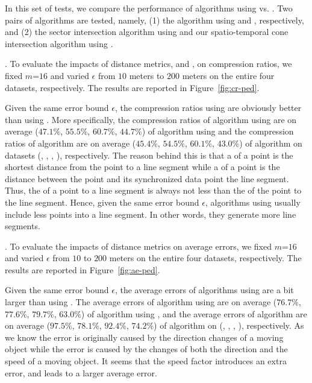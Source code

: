 {In this set of tests, we compare the performance of algorithms using \ped vs. \sed. Two pairs of algorithms are tested, namely, (1) the algorithm \dpa using \ped and \sed, respectively, and (2) the sector intersection  algorithm \cite{Williams:Longest, Sklansky:Cone} using \ped and our spatio-temporal cone intersection algorithm using \sed.

.
To evaluate the impacts of distance metrics, \ie \ped and \sed, on compression ratios, we fixed {$m$=$16$} and varied $\epsilon$ from $10$ meters to $200$ meters on the entire four datasets, respectively.
The results are reported in Figure~\ref{fig:cr-ped}.


Given the same error bound $\epsilon$, the compression ratios using \ped are obviously better
than using \sed.
More specifically, the compression ratios of algorithm \dpa
using \ped are on average ($47.1\%$, $55.5\%$, $60.7\%$, $44.7\%$) of algorithm \dpa using \sed and
the compression ratios of algorithm \cist are on average
($45.4\%$, $54.5\%$, $60.1\%$, $43.0\%$) of algorithm  on datasets (\sercar, \geolife, \mopsi, \pricar), respectively.
{The reason behind this is that a \ped of a point is the shortest
distance from the point to a line segment while a \sed of a point is the distance between the point and its synchronized data point \wrt the line segment. Thus, the \sed of a point to a line segment is always not less than the \ped of the point to the line segment. Hence, given the same error bound $\epsilon$, \lsa algorithms using \sed usually include less points into a line segment. In other words, they generate more line segments.}

.
To evaluate the impacts of distance metrics on average errors, we fixed {$m$=$16$} and varied $\epsilon$ from $10$ to $200$ meters on the entire four datasets, respectively.
The results are reported in Figure~\ref{fig:ae-ped}.


Given the same error bound $\epsilon$, the average errors of algorithms using \sed are a bit larger than using \ped.
The average errors of algorithm \dpa using \ped are on average
($76.7\%$, $77.6\%$, $79.7\%$, $63.0\%$) of algorithm \dpa  using \sed, and  the average
errors of algorithm   are on average
($97.5\%$, $78.1\%$, $92.4\%$, $74.2\%$) of algorithm \cist on (\sercar, \geolife, \mopsi, \pricar), respectively.
{As we know the \ped error is originally caused by the direction changes of a moving object while the
\sed error is caused by the changes of both the direction and the speed of a moving object. It seems that the speed factor introduces an extra error, and leads to a larger average error. }


}
